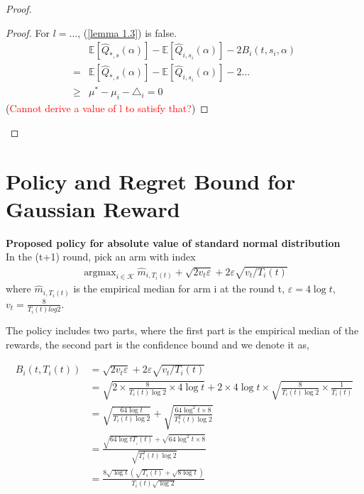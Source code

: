 \documentclass{article}
\DeclareMathOperator*{\argmax}{argmax}
\theoremstyle{plain}
\begin{document}
\begin{proof}
\begin{proof}
    For $l = ...$, (\ref{lemma 1.3}) is false.
    \begin{align}
        & \mathbb{E}[\hat{Q}_{*, s}(\alpha)] - \mathbb{E}[\hat{Q}_{i, s_i}(\alpha)] - 2 B_i(t, s_i, \alpha) \\
        = &\mathbb{E}[\hat{Q}_{*, s}(\alpha)] - \mathbb{E}[\hat{Q}_{i, s_i}(\alpha)] - 2 ... \\
        \geq & \mu^\ast - \mu_i - \triangle_i = 0
    \end{align}
    (\textcolor{red}{Cannot derive a value of l to satisfy that?})
\end{proof}
   
\end{proof}


\section{Policy and Regret Bound for Gaussian Reward}

\textbf{Proposed policy for absolute value of standard normal distribution}\\
In the (t+1) round, pick an arm with index 
\begin{align}
\label{policy normal}
   \argmax_{i \in \mathcal{K}} \hat{m}_{i, T_i(t)} + \sqrt{2v_t \varepsilon} + 2 \varepsilon \sqrt{v_t/T_i(t)}
\end{align}
where $\hat{m}_{i, T_i(t)}$ is the empirical median for arm i at the round t, $\varepsilon = 4 \log t$, $v_t = \frac{8}{T_i(t) log2}$. 

The policy includes two parts, where the first part is the empirical median of the rewards, the second part is the confidence bound and we denote it as,

\begin{align}
\label{B_i(i, T_i(t)) definition}
B_i(t, T_i(t)) &= \sqrt{2v_t \varepsilon} + 2 \varepsilon \sqrt{v_t/T_i(t)}\\
&= \sqrt{2 \times \frac{8}{T_i(t) \log 2} \times 4 \log t} + 2 \times 4 \log t \times \sqrt{\frac{8}{T_i(t) \log 2} \times \frac{1}{T_i(t)}}\\
&= \sqrt{\frac{64 \log t}{T_i(t) \log 2}} + \sqrt{\frac{64 \log^2 t \times 8}{T_i^2(t) \log 2}}\\
&= \frac{\sqrt{64 \log t T__i(t)} + \sqrt{64 \log^2 t \times 8}}{\sqrt{T_i^2(t) \log 2}}\\
\label{B_i(i, T_i(t)) definition 2}
&= \frac{8 \sqrt{\log t} (\sqrt{ T_i(t)} + \sqrt{8\log t})}{T_i(t)  \sqrt{\log 2}}
\end{align}
\end{document}
